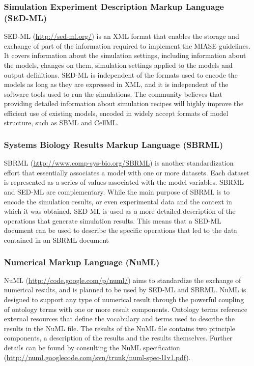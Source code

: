 \subsubsection{Simulation Experiment Description Markup Language
(SED-ML)}

SED-ML (\url{http://sed-ml.org/}) \autocite{kohn2008sed} is an XML
format that enables the storage and exchange of part of the information
required to implement the MIASE guidelines. It covers information about
the simulation settings, including information about the models, changes
on them, simulation settings applied to the models and output
definitions. SED-ML is independent of the formats used to encode the
models as long as they are expressed in XML, and it is independent of
the software tools used to run the simulations. The community believes
that providing detailed information about simulation recipes will highly
improve the efficient use of existing models, encoded in widely accept
formats of model structure, such as SBML and CellML.

\subsubsection{Systems Biology Results Markup Language (SBRML)}

SBRML (\url{http://www.comp-sys-bio.org/SBRML}) \autocite{dada2010sbrml}
is another standardization effort that essentially associates a model
with one or more datasets. Each dataset is represented as a series of
values associated with the model variables. SBRML and SED-ML are
complementary. While the main purpose of SBRML is to encode the
simulation results, or even experimental data and the context in which
it was obtained, SED-ML is used as a more detailed description of the
operations that generate simulation results. This means that a SED-ML
document can be used to describe the specific operations that led to the
data contained in an SBRML document

\subsubsection{Numerical Markup Language (NuML)}

NuML (\url{http://code.google.com/p/numl/}) aims to standardize the
exchange of numerical results, and is planned to be used by SED-ML and
SBRML. NuML is designed to support any type of numerical result through
the powerful coupling of ontology terms with one or more result
components. Ontology terms reference external resources that define the
vocabulary and terms used to describe the results in the NuML file. The
results of the NuML file contains two principle components, a
description of the results and the results themselves. Further details
can be found by consulting the NuML specification
(\url{http://numl.googlecode.com/svn/trunk/numl-spec-l1v1.pdf}).

